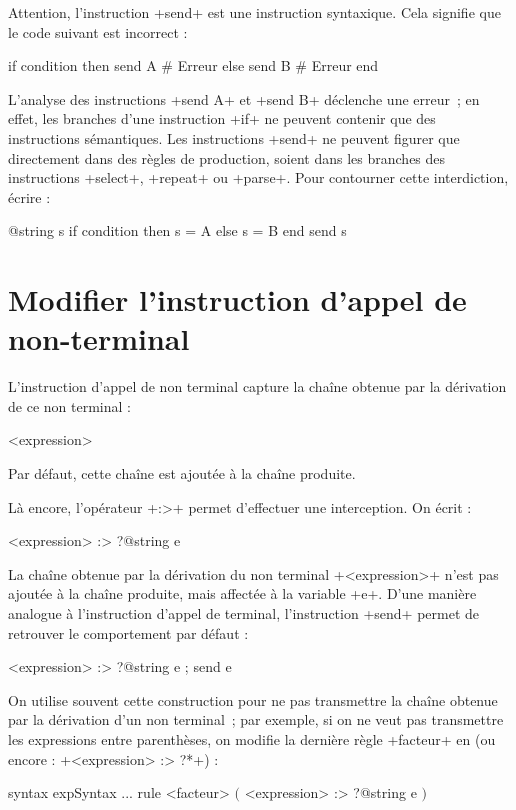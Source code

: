 Attention, l'instruction \ggs+send+ est une instruction syntaxique. Cela signifie que le code suivant est incorrect :

\begin{galgas}
if condition then
  send A # Erreur
else
  send B # Erreur
end
\end{galgas}

L'analyse des instructions \ggs+send A+ et  \ggs+send B+ déclenche une erreur~; en effet, les branches d'une instruction \ggs+if+ ne peuvent contenir que des instructions sémantiques. Les instructions \ggs+send+ ne peuvent figurer que directement dans des règles de production, soient dans les branches des instructions \ggs+select+, \ggs+repeat+ ou \ggs+parse+. Pour contourner cette interdiction, écrire :
\begin{galgas}
@string s
if condition then
  s = A
else
  s = B
end
send s
\end{galgas}



\section{Modifier l'instruction d'appel de non-terminal}

L'instruction d'appel de non terminal capture la chaîne obtenue par la dérivation de ce non terminal :
\begin{galgas}
<expression>
\end{galgas}


Par défaut, cette chaîne est ajoutée à la chaîne produite.

Là encore, l'opérateur \ggs+:>+ permet d'effectuer une interception. On écrit :
\begin{galgas}
<expression> :> ?@string e
\end{galgas}

La chaîne obtenue par la dérivation du non terminal \ggs+<expression>+ n'est pas ajoutée à la chaîne produite, mais affectée à la variable \ggs+e+. D'une manière analogue à l'instruction d'appel de terminal, l'instruction \ggs+send+ permet de retrouver le comportement par défaut :
\begin{galgas}
<expression> :> ?@string e ; send e
\end{galgas}

On utilise souvent cette construction pour ne pas transmettre la chaîne obtenue par la dérivation d'un non terminal~; par exemple, si on ne veut pas transmettre les expressions entre parenthèses, on modifie la dernière règle \ggs+facteur+ en (ou encore : \ggs+<expression> :> ?*+) :
\begin{galgas}
syntax expSyntax {
  ...
  rule <facteur> {
    $($
    <expression> :> ?@string e
    $)$
  }
}
\end{galgas}


